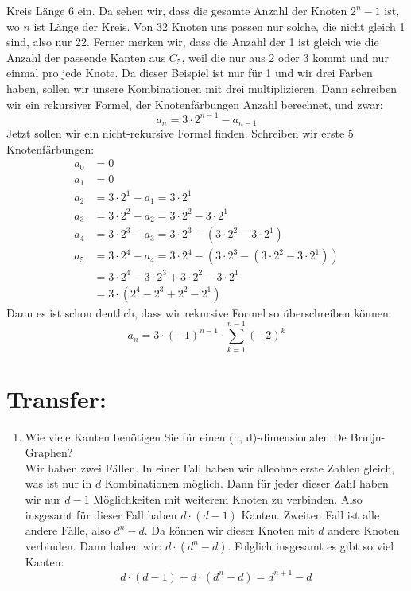 Kreis Länge 6 ein. Da sehen wir, dass die gesamte Anzahl der 
        Knoten $2^n-1$ ist, wo $n$ ist Länge der Kreis. Von 32 Knoten uns passen nur solche, die nicht 
        gleich 1 sind, also nur 22. Ferner merken wir, dass die Anzahl der 1 ist gleich wie die Anzahl 
        der passende Kanten aus $C_5$, weil die nur aus 2 oder 3 kommt und nur einmal pro jede Knote. 
        Da dieser Beispiel ist nur für 1 und wir drei Farben haben, sollen wir unsere Kombinationen 
        mit drei multiplizieren. Dann schreiben wir ein rekursiver Formel, der Knotenfärbungen Anzahl 
        berechnet, und zwar: $$ a_n = 3\cdot 2^{n-1} - a_{n-1} $$
        Jetzt sollen wir ein nicht-rekursive Formel finden. Schreiben wir erste 5 Knotenfärbungen:
        \begin{align*}
            a_0 &= 0\\
            a_1 &= 0\\
            a_2 &= 3\cdot 2^1 - a_1 = 3\cdot 2^1\\
            a_3 &= 3\cdot 2^2 - a_2 = 3\cdot 2^2 - 3\cdot 2^1\\
            a_4 &= 3\cdot 2^3 - a_3 = 3\cdot 2^3 - (3\cdot 2^2 - 3\cdot 2^1)\\
            a_5 &= 3\cdot 2^4 - a_4 = 3\cdot 2^4 - (3\cdot 2^3 - (3\cdot 2^2 - 3\cdot 2^1))\\
            &= 3\cdot 2^4 - 3\cdot 2^3 + 3\cdot 2^2 - 3\cdot 2^1\\
            &= 3\cdot (2^4 - 2^3 + 2^2 - 2^1)
        \end{align*} 
        Dann es ist schon deutlich, dass wir rekursive Formel so überschreiben können:
        $$ a_n = 3 \cdot (-1)^{n-1} \cdot \sum_{k=1}^{n-1}(-2)^k$$
    \section*{Transfer:}
    \begin{enumerate}[label=(\alph*)]
    	\item Wie viele Kanten benötigen Sie für einen (n, d)-dimensionalen De Bruijn-Graphen?\\
        Wir haben zwei Fällen. In einer Fall haben wir alleohne erste Zahlen gleich, was ist nur in $d$ 
        Kombinationen möglich. Dann für jeder dieser Zahl haben wir nur $d-1$ Möglichkeiten mit weiterem 
        Knoten zu verbinden. Also insgesamt für dieser Fall haben $d\cdot(d-1)$ Kanten. Zweiten Fall 
        ist alle andere Fälle, also $d^n-d$. Da können wir dieser Knoten mit $d$ andere Knoten verbinden.
        Dann haben wir: $d\cdot(d^n-d)$. Folglich insgesamt es gibt so viel Kanten:
        $$d\cdot(d-1) + d\cdot(d^n-d) = d^{n+1}-d$$
    \end{enumerate}
